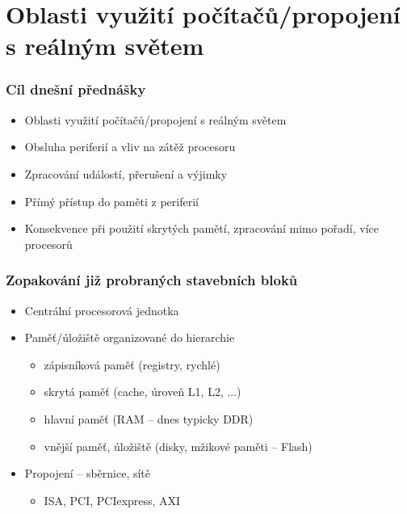 \documentclass{beamer}
\subtitle{Lekce 08. Přerušení a události}
\author{Pavel Píša \phantom{xxxxxxxxx} Petr Štěpán \\ \small\texttt{pisa@fel.cvut.cz}\phantom{xxxx}\small\texttt{stepan@fel.cvut.cz}}
\begin{document}
\maketitle

\section{Oblasti využití počítačů/propojení s reálným světem}

\begin{frame}
\frametitle{Cíl dnešní přednášky}

\begin{itemize}
 \item Oblasti využití počítačů/propojení s reálným světem
 \item Obsluha periferií a vliv na zátěž procesoru
 \item Zpracování událostí, přerušení a výjimky
 \item Přímý přístup do paměti z periferií
 \item Konsekvence při použití skrytých pamětí, zpracování mimo pořadí, více procesorů
\end{itemize}
\end{frame}

\begin{frame}
\frametitle{Zopakování již probraných stavebních bloků}

\begin{itemize}
 \item Centrální procesorová jednotka
 \item Paměť/úložiště organizované do hierarchie
 \begin{itemize}
  \item zápisníková paměť (registry, rychlé)
  \item skrytá paměť (cache, úroveň L1, L2, ...)
  \item hlavní paměť (RAM -- dnes typicky DDR)
  \item vnější paměť, úložiště (disky, mžikové paměti -- Flash)
 \end{itemize}
 \item Propojení -- sběrnice, sítě
 \begin{itemize}
  \item ISA, PCI, PCIexpress, AXI
 \end{itemize}
\end{itemize}
\end{frame}
\end{document}
